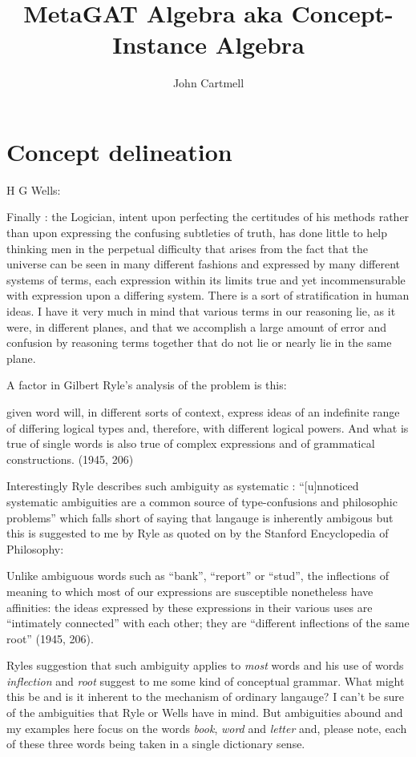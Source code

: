 \documentclass[10pt,a4paper]{article}
\title{MetaGAT Algebra aka Concept-Instance Algebra}
\author{John Cartmell}
\begin{document}
\maketitle

\section{Concept delineation}
\note 
H G Wells:
\begin{tightquote}
Finally : the Logician, intent upon perfecting the certitudes of his methods rather than upon expressing the confusing subtleties of truth, has done little to help thinking men in the perpetual difficulty that arises from the fact that the universe can be seen in many different fashions and expressed by many different systems of terms, each expression within its limits true and yet incommensurable with expression upon a differing system. There is a sort of stratification in human ideas. I have it very much in mind that various terms in our reasoning lie, as it were, in different planes, and that we accomplish a large amount of error and confusion by reasoning terms together that do not lie or nearly lie in the same plane.
\end{tightquote}
\note
A factor in Gilbert Ryle's analysis of the problem is this:
\begin{tightquote}
[a] given word will, in different sorts of context, express ideas of an indefinite range of differing logical types and, therefore, with different logical powers. And what is true of single words is also true of complex expressions and of grammatical constructions. (1945, 206)
\end{tightquote}
Interestingly Ryle describes such ambiguity as systematic : “[u]nnoticed systematic ambiguities are a common source of type-confusions and philosophic problems” which falls short of saying that langauge is inherently ambigous but this is suggested to me by Ryle as quoted on
by the Stanford Encyclopedia of Philosophy:
\begin{tightquote}
Unlike ambiguous words such as “bank”, “report” or “stud”, the inflections of meaning to which most of our expressions are susceptible nonetheless have affinities: the ideas expressed by these expressions in their various uses are “intimately connected” with each other; they are “different inflections of the same root” (1945, 206).
\end{tightquote}
Ryles suggestion that such ambiguity applies to \textit{most} words and his use of words \textit{inflection} and \textit{root} suggest to me some kind of conceptual grammar. What might this be and is it inherent to the mechanism  of ordinary langauge? 
\note 
I can't be sure of the ambiguities that Ryle or Wells have in mind. But ambiguities abound and my examples here focus on the words \textit{book},
\textit{word} and \textit{letter} and, please note, each of these three words being taken in a single dictionary sense.
\end{document}

